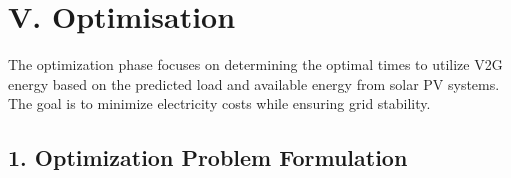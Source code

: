 \documentclass[letterpaper,10pt,english]{sphinxmanual}
\begin{document}
\begin{sphinxVerbatim}[commandchars=\\\{\}]
      
    
   
\end{sphinxVerbatim}



\chapter{V. Optimisation}
\label{\detokenize{index:v-optimisation}}
\sphinxAtStartPar
The optimization phase focuses on determining the optimal times to utilize V2G energy based on the predicted load and available energy from solar PV systems.
The goal is to minimize electricity costs while ensuring grid stability.


\section{1. Optimization Problem Formulation}
\label{\detokenize{index:optimization-problem-formulation}}
\sphinxAtStartPar
{}
\end{document}
